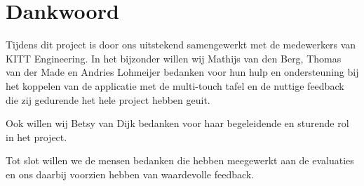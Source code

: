 \documentclass{acm}
\begin{document}
\section{Dankwoord}
Tijdens dit project is door ons uitstekend samengewerkt met de medewerkers van KITT Engineering. In het bijzonder willen wij Mathijs van den Berg, Thomas van der Made en Andries Lohmeijer bedanken voor hun hulp en ondersteuning bij het koppelen van de applicatie met de multi-touch tafel en de nuttige feedback die zij gedurende het hele project hebben geuit.

Ook willen wij Betsy van Dijk bedanken voor haar begeleidende en sturende rol in het project.

Tot slot willen we de mensen bedanken die hebben meegewerkt aan de evaluaties en ons daarbij voorzien hebben van waardevolle feedback.




\appendix
\end{document}

